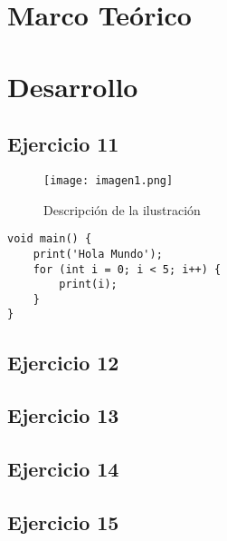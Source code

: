 \documentclass[12pt,letterpaper]{article}
\begin{document}
\section{Marco Teórico}



\section{Desarrollo}
\subsection{Ejercicio 11}


\begin{figure}[h!]
    \centering
    \texttt{[image: imagen1.png]}
    \caption{Descripción de la ilustración}
    \label{fig:ulustracion1}
\end{figure}

\begin{center}
\begin{lstlisting}
void main() {
    print('Hola Mundo');
    for (int i = 0; i < 5; i++) {
        print(i);
    }
}
\end{lstlisting}
\end{center}


\subsection{Ejercicio 12}


\subsection{Ejercicio 13}


\subsection{Ejercicio 14}


\subsection{Ejercicio 15}

\end{document}
